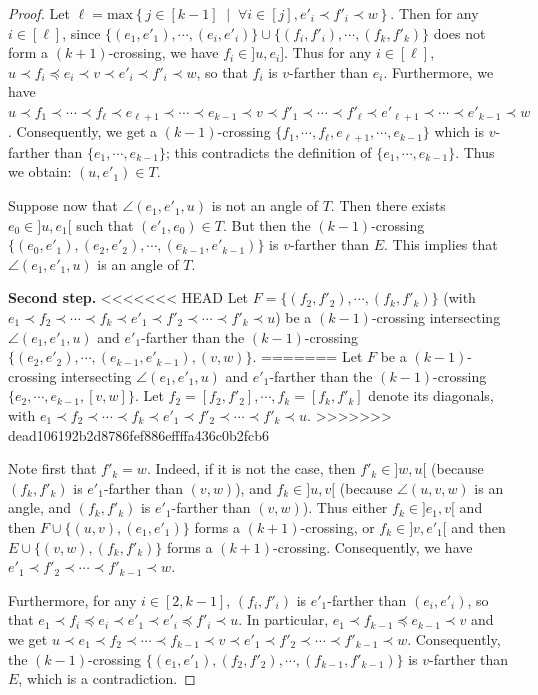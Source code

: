 \documentclass{amsart}
\theoremstyle{remark}
\newcommand{\cl}{\prec}
\newcommand{\cle}{\preccurlyeq}
\newcommand{\set}[2]{\left\{ #1 \;\middle|\; #2 \right\}} %
\begin{document}
\begin{proof}
Let $\ell = \text{max}\set{j\in[k-1]}{\forall i\in[j],e'_i \cl f'_i \cl w}$.
Then for any $i\in[\ell]$, since $\{(e_1,e'_1), \cdots , (e_i,e'_i)\} \cup \{(f_i,f'_i), \cdots , (f_k,f'_k)\}$ does not form a $(k + 1)$-crossing, we have $f_i \in ]u, e_i]$. 
Thus for any $i\in[\ell]$, $u \cl f_i \cle e_i \cl v \cl e'_i \cl f'_i \cl w$, so that $f_i$ is $v$-farther than $e_i$.
Furthermore, we have $u \cl f_1 \cl \cdots \cl f_\ell \cl e_{\ell+1} \cl \cdots \cl e_{k-1} \cl v \cl f'_1 \cl \cdots \cl f'_\ell \cl e'_{\ell+1} \cl \cdots \cl e'_{k-1} \cl w$. 
Consequently, we get a $(k - 1)$-crossing $\{f_1, \cdots , f_\ell
, e_{\ell+1}, \cdots , e_{k-1}\}$ which is $v$-farther than $\{e_1, \cdots , e_{k-1}\}$; this contradicts the definition of $\{e_1, \cdots , e_{k-1}\}$. 
Thus we obtain: $(u, e'_1) \in  T$.

Suppose now that $\angle(e_1, e'_1, u)$ is not an angle of $T$. 
Then there exists $e_0 \in ]u, e_1[$ such that $(e'_1, e_0) \in  T$. 
But then the $(k - 1)$-crossing $\{(e_0, e'_1), (e_2,e'_2), \cdots , (e_{k-1},e'_{k-1})\}$ is $v$-farther than $E$. 
This implies that $\angle(e_1, e'_1, u)$ is an angle of $T$.



{\bf Second step.}
<<<<<<< HEAD
Let $F=\{(f_2,f'_2), \cdots , (f_{k},f'_{k})\}$ (with $e_1 \cl f_2 \cl \cdots \cl f_{k} \cl e'_1 \cl f'_2 \cl \cdots \cl f'_{k} \cl u$) be a $(k - 1)$-crossing intersecting $\angle(e_1, e'_1, u)$ and $e'_1$-farther than the $(k-1)$-crossing $\{(e_2,e'_2), \cdots , (e_{k-1},e'_{k-1}), (v, w)\}$.
=======
Let $F$ be a $(k - 1)$-crossing intersecting $\angle(e_1, e'_1, u)$ and $e'_1$-farther than the $(k-1)$-crossing $\{e_2, \cdots , e_{k-1}, [v, w]\}$. 
Let $f_2 = [f_2, f'_2], \cdots , f_k = [f_k, f'_k]$ denote its diagonals, with $e_1 \cl f_2 \cl \cdots \cl f_k \cl e'_1 \cl f'_2 \cl \cdots \cl f'_k \cl u$.
>>>>>>> dead106192b2d8786fef886effffa436c0b2fcb6

Note first that $f'_{k} = w$. 
Indeed, if it is not the case, then $f'_{k} \in ]w, u[$ (because $(f_k,f'_k)$ is $e'_1$-farther than $(v,w)$), and $f_{k} \in ]u,v[$ (because $\angle(u, v, w)$ is an angle, and $(f_k,f'_k)$ is $e'_1$-farther than $(v,w)$).
Thus either $f_k \in ]e_1, v[$ and then $F \cup \{(u, v), (e_1,e'_1)\}$ forms a $(k + 1)$-crossing, or $f_k \in ]v, e'_1[$ and then $E \cup \{(v,w),(f_k, f'_k)\}$ forms a $(k + 1)$-crossing. 
Consequently, we have $e'_1 \cl f'_2 \cl \cdots \cl f'_{k-1} \cl w$.

Furthermore, for any $i\in[2,k-1]$, $(f_i,f'_i)$ is $e'_1$-farther than $(e_i,e'_i)$, so that $e_1 \cl f_i \cle e_i \cl e'_1 \cl e'_i \cle f'_i \cl u$. 
In particular, $e_1 \cl f_{k-1} \cle e_{k-1} \cl v$ and we get $u \cl e_1 \cl f_2 \cl \cdots \cl f_{k-1} \cl v \cl e'_1 \cl f'_2 \cl \cdots \cl f'_{k-1} \cl w$.
Consequently, the $(k - 1)$-crossing $\{(e_1,e'_1), (f_2,f'_2), \cdots , (f_{k-1},f'_{k-1})\}$ is $v$-farther than $E$, which is a contradiction.











\end{proof}
\end{document}
